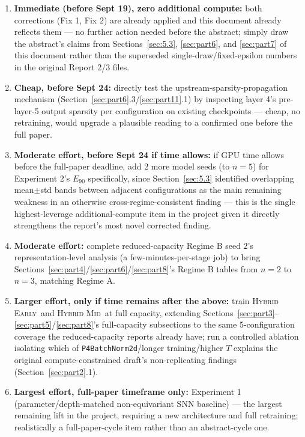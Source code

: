 \documentclass[11pt]{article}
\newcommand{\HybridEarly}{\textsc{Hybrid Early}}
\newcommand{\HybridMid}{\textsc{Hybrid Mid}}
\begin{document}
\begin{enumerate}[leftmargin=1.8em]
\item \textbf{Immediate (before Sept 19), zero additional compute:} both corrections (Fix 1, Fix 2) are
already applied and this document already reflects them --- no further action needed before the
abstract; simply draw the abstract's claims from Sections~\ref{sec:5.3}, \ref{sec:part6}, and
\ref{sec:part7} of this document rather than the superseded single-draw/fixed-epsilon numbers in the
original Report 2/3 files.
\item \textbf{Cheap, before Sept 24:} directly test the upstream-sparsity-propagation mechanism
(Section~\ref{sec:part6}.3/\ref{sec:part11}.1) by inspecting layer 4's pre-layer-5 output sparsity per
configuration on existing checkpoints --- cheap, no retraining, would upgrade a plausible reading to a
confirmed one before the full paper.
\item \textbf{Moderate effort, before Sept 24 if time allows:} if GPU time allows before the full-paper
deadline, add 2 more model seeds (to $n{=}5$) for Experiment 2's $E_{90}$ specifically, since
Section~\ref{sec:5.3} identified overlapping mean$\pm$std bands between adjacent configurations as the
main remaining weakness in an otherwise cross-regime-consistent finding --- this is the single
highest-leverage additional-compute item in the project given it directly strengthens the report's most
novel corrected finding.
\item \textbf{Moderate effort:} complete reduced-capacity Regime B seed 2's representation-level
analysis (a few-minutes-per-stage job) to bring Sections~\ref{sec:part4}/\ref{sec:part6}/\ref{sec:part8}'s
Regime B tables from $n{=}2$ to $n{=}3$, matching Regime A.
\item \textbf{Larger effort, only if time remains after the above:} train \HybridEarly\ and \HybridMid\
at full capacity, extending Sections~\ref{sec:part3}--\ref{sec:part5}/\ref{sec:part8}'s full-capacity
subsections to the same 5-configuration coverage the reduced-capacity reports already have; run a
controlled ablation isolating which of \texttt{P4BatchNorm2d}/longer training/higher $T$ explains the
original compute-constrained draft's non-replicating findings (Section~\ref{sec:part2}.1).
\item \textbf{Largest effort, full-paper timeframe only:} Experiment 1 (parameter/depth-matched
non-equivariant SNN baseline) --- the largest remaining lift in the project, requiring a new
architecture and full retraining; realistically a full-paper-cycle item rather than an abstract-cycle
one.
\end{enumerate}
\end{document}
